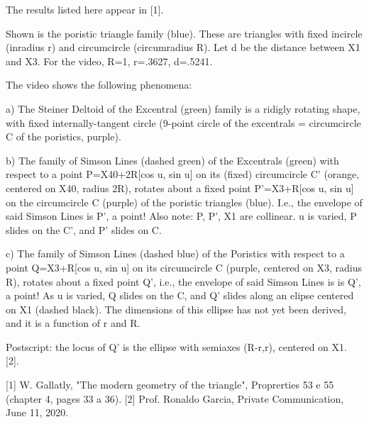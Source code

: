 The results listed here appear in [1].

Shown is the poristic triangle family (blue). These are triangles with fixed incircle (inradius r) and circumcircle (circumradius R). Let d be the distance between X1 and X3. For the video, R=1,  r=.3627, d=.5241.

The video shows the following phenomena:

a) The Steiner Deltoid of the Excentral (green) family is a ridigly rotating shape, with fixed internally-tangent circle (9-point circle of the excentrals = circumcircle C of the poristics, purple).

b) The family of Simson Lines (dashed green) of the Excentrals (green) with respect to a point P=X40+2R[cos u, sin u] on its (fixed) circumcircle C' (orange, centered on X40, radius 2R), rotates about a fixed point P'=X3+R[cos u, sin u] on the circumcircle C (purple) of the poristic triangles (blue). I.e., the envelope of said Simson Lines is P', a point! Also note: P, P', X1 are collinear. u is varied, P slides on the C', and P' slides on C.

c) The family of Simson Lines (dashed blue) of the Poristics with respect to a point Q=X3+R[cos u, sin u] on its circumcircle C (purple, centered on X3, radius R), rotates about a fixed point Q', i.e., the envelope of said Simson Lines is is Q', a point! As u is varied, Q slides on the C, and Q' slides along an elipse centered on X1 (dashed black). The dimensions of this ellipse has not yet been derived, and it is a function of r and R.

Postscript: the locus of Q' is the ellipse with semiaxes (R-r,r), centered on X1. [2].

[1] W. Gallatly, "The modern geometry of the triangle", Proprerties 53 e 55 (chapter 4, pages 33 a 36).
[2] Prof. Ronaldo Garcia, Private Communication, June 11, 2020.